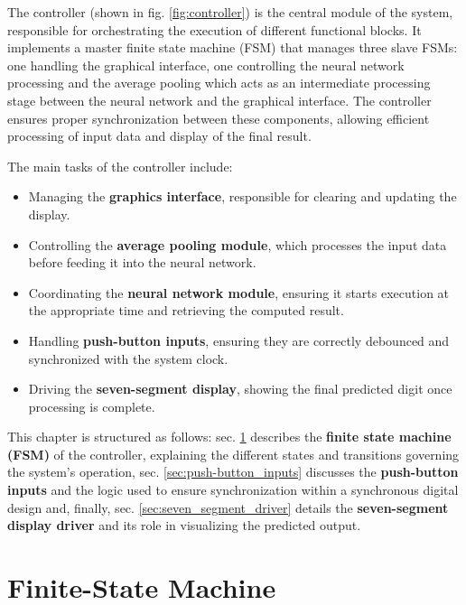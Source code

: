 \documentclass[11pt]{report}
\begin{document}
The controller (shown in fig. \ref{fig:controller}) is the central module of the system, responsible for orchestrating the execution of different functional blocks. It implements a master finite state machine (FSM) that manages three slave FSMs: one handling the graphical interface, one controlling the neural network processing and the average pooling which acts as an intermediate processing stage between the neural network and the graphical interface. The controller ensures proper synchronization between these components, allowing efficient processing of input data and display of the final result.  

The main tasks of the controller include:  
\begin{itemize}  
    \item Managing the \textbf{graphics interface}, responsible for clearing and updating the display.  
    \item Controlling the \textbf{average pooling module}, which processes the input data before feeding it into the neural network.  
    \item Coordinating the \textbf{neural network module}, ensuring it starts execution at the appropriate time and retrieving the computed result.  
    \item Handling \textbf{push-button inputs}, ensuring they are correctly debounced and synchronized with the system clock.  
    \item Driving the \textbf{seven-segment display}, showing the final predicted digit once processing is complete.  
\end{itemize}  

This chapter is structured as follows: sec. \ref{sec:fsm_controller} describes the \textbf{finite state machine (FSM)} of the controller, explaining the different states and transitions governing the system's operation, sec. \ref{sec:push-button_inputs} discusses the \textbf{push-button inputs} and the logic used to ensure synchronization within a synchronous digital design and, finally, sec. \ref{sec:seven_segment_driver} details the \textbf{seven-segment display driver} and its role in visualizing the predicted output.   

\section{Finite-State Machine}
\label{sec:fsm_controller}
\end{document}
